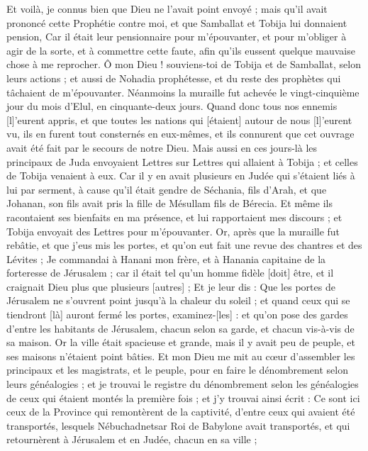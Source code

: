 \begin{multicols}{2}
Et voilà, je connus bien que Dieu ne l'avait point envoyé ; mais qu'il avait prononcé cette Prophétie contre moi, et que Samballat et Tobija lui donnaient pension,
Car il était leur pensionnaire pour m'épouvanter, et pour m'obliger à agir de la sorte, et à commettre cette faute, afin qu'ils eussent quelque mauvaise chose à me reprocher.
Ô mon Dieu ! souviens-toi de Tobija et de Samballat, selon leurs actions ; et aussi de Nohadia prophétesse, et du reste des prophètes qui tâchaient de m'épouvanter.
Néanmoins la muraille fut achevée le vingt-cinquième jour du mois d'Elul, en cinquante-deux jours.
Quand donc tous nos ennemis [l]'eurent appris, et que toutes les nations qui [étaient] autour de nous [l]'eurent vu, ils en furent tout consternés en eux-mêmes, et ils connurent que cet ouvrage avait été fait par le secours de notre Dieu.
Mais aussi en ces jours-là les principaux de Juda envoyaient Lettres sur Lettres qui allaient à Tobija ; et celles de Tobija venaient à eux.
Car il y en avait plusieurs en Judée qui s'étaient liés à lui par serment, à cause qu'il était gendre de Séchania, fils d'Arah, et que Johanan, son fils avait pris la fille de Mésullam fils de Bérecia.
Et même ils racontaient ses bienfaits en ma présence, et lui rapportaient mes discours ; et Tobija envoyait des Lettres pour m'épouvanter.
\VerseOne{}Or, après que la muraille fut rebâtie, et que j'eus mis les portes, et qu'on eut fait une revue des chantres et des Lévites ;
Je commandai à Hanani mon frère, et à Hanania capitaine de la forteresse de Jérusalem ; car il était tel qu'un homme fidèle [doit] être, et il craignait Dieu plus que plusieurs [autres] ;
Et je leur dis : Que les portes de Jérusalem ne s'ouvrent point jusqu'à la chaleur du soleil ; et quand ceux qui se tiendront [là] auront fermé les portes, examinez-[les] : et qu'on pose des gardes d'entre les habitants de Jérusalem, chacun selon sa garde, et chacun vis-à-vis de sa maison.
Or la ville était spacieuse et grande, mais il y avait peu de peuple, et ses maisons n'étaient point bâties.
Et mon Dieu me mit au cœur d'assembler les principaux et les magistrats, et le peuple, pour en faire le dénombrement selon leurs généalogies ; et je trouvai le registre du dénombrement selon les généalogies de ceux qui étaient montés la première fois ; et j'y trouvai ainsi écrit :
Ce sont ici ceux de la Province qui remontèrent de la captivité, d'entre ceux qui avaient été transportés, lesquels Nébuchadnetsar Roi de Babylone avait transportés, et qui retournèrent à Jérusalem et en Judée, chacun en sa ville ;

\end{multicols}
